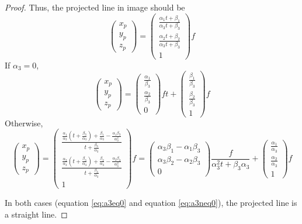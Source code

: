 \documentclass[a4paper,11pt]{article}
\begin{document}
\begin{proof}
Thus, the projected line in image should be
\[ \begin{pmatrix} x_p \\ y_p \\ z_p \end{pmatrix} 
  = \begin{pmatrix} \frac{\alpha_1 t + \beta_1}{\alpha_3 t + \beta_3} \\ \frac{\alpha_2 t + \beta_2}{\alpha_3 t + \beta_3} \\ 1 \end{pmatrix} f \]
If $\alpha_3 = 0$,
\begin{equation}
  \label{eq:a3eq0}
  \begin{pmatrix} x_p \\ y_p \\ z_p \end{pmatrix} 
  = \begin{pmatrix} \frac{\alpha_1}{\beta_3} \\ \frac{\alpha_2}{\beta_3} \\ 0 \end{pmatrix} ft 
  + \begin{pmatrix} \frac{\beta_1}{\beta_3} \\ \frac{\beta_2}{\beta_3} \\ 1 \end{pmatrix} f 
\end{equation}
Otherwise,
 \begin{equation}
  \label{eq:a3neq0}
  \begin{pmatrix} x_p \\ y_p \\ z_p \end{pmatrix} 
  = \begin{pmatrix} \frac{\frac{\alpha_1}{\alpha_3}(t + \frac{\beta_3}{\alpha_3}) + \frac{\beta_1}{\alpha_3} - \frac{\alpha_1\beta_3}{\alpha_3^2}}{t + \frac{\beta_3}{\alpha_3}} \\
  \frac{\frac{\alpha_2}{\alpha_3}(t + \frac{\beta_3}{\alpha_3}) + \frac{\beta_2}{\alpha_3} - \frac{\alpha_2\beta_3}{\alpha_3^2}}{t + \frac{\beta_3}{\alpha_3}} \\
   1 \end{pmatrix} f
   = \begin{pmatrix} \alpha_3\beta_1- \alpha_1\beta_3 \\
   \alpha_3\beta_2- \alpha_2\beta_3 \\
   0 \end{pmatrix} \frac{f}{\alpha_3^2 t + \beta_3\alpha_3}
   + \begin{pmatrix} \frac{\alpha_1}{\alpha_3} \\ \frac{\alpha_2}{\alpha_3} \\ 1 \end{pmatrix} f 
\end{equation}

In both cases (equation \ref{eq:a3eq0} and equation \ref{eq:a3neq0}), the projected line is a straight line. 

\end{proof}
\end{document}
